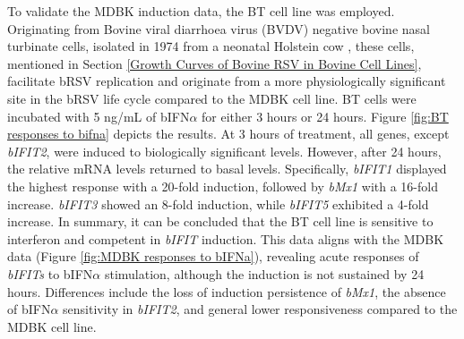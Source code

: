 To validate the MDBK induction data, the BT cell line was employed. Originating from Bovine viral diarrhoea virus (BVDV) negative bovine nasal turbinate cells, isolated in 1974 from a neonatal Holstein cow \cite{McClurkin1974ComparisonVirus.}, these cells, mentioned in Section \ref{Growth Curves of Bovine RSV in Bovine Cell Lines}, facilitate bRSV replication and originate from a more physiologically significant site in the bRSV life cycle compared to the MDBK cell line. BT cells were incubated with 5 ng/mL of bIFN\(\alpha\) for either 3 hours or 24 hours. Figure \ref{fig:BT responses to bifna} depicts the results. At 3 hours of treatment, all genes, except \textit{bIFIT2}, were induced to biologically significant levels. However, after 24 hours, the relative mRNA levels returned to basal levels. Specifically, \textit{bIFIT1} displayed the highest response with a 20-fold induction, followed by \textit{bMx1} with a 16-fold increase. \textit{bIFIT3} showed an 8-fold induction, while \textit{bIFIT5} exhibited a 4-fold increase. In summary, it can be concluded that the BT cell line is sensitive to interferon and competent in \textit{bIFIT} induction. This data aligns with the MDBK data (Figure \ref{fig:MDBK responses to bIFNa}), revealing acute responses of \textit{bIFITs} to bIFN\(\alpha\) stimulation, although the induction is not sustained by 24 hours. Differences include the loss of induction persistence of \textit{bMx1}, the absence of bIFN\(\alpha\) sensitivity in \textit{bIFIT2}, and general lower responsiveness compared to the MDBK cell line.

